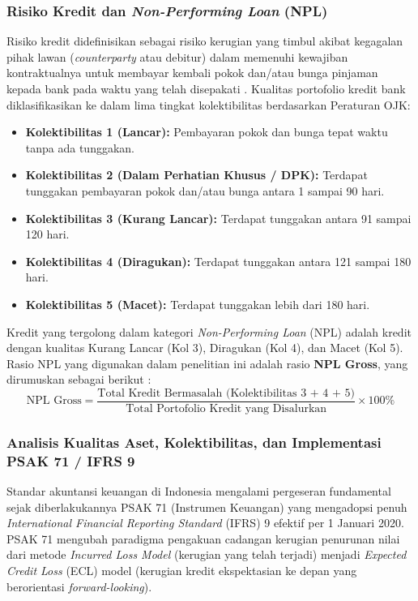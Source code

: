 \documentclass[12pt,a4paper]{article}
\numberwithin{equation}{section}
\begin{document}
\subsubsection{Risiko Kredit dan \emph{Non-Performing Loan} (NPL)}
\noindent
Risiko kredit didefinisikan sebagai risiko kerugian yang timbul akibat kegagalan pihak lawan (\emph{counterparty} atau debitur) dalam memenuhi kewajiban kontraktualnya untuk membayar kembali pokok dan/atau bunga pinjaman kepada bank pada waktu yang telah disepakati \citep{KuncoroSuhardjono2018}. Kualitas portofolio kredit bank diklasifikasikan ke dalam lima tingkat kolektibilitas berdasarkan Peraturan OJK:
\begin{itemize}
  \item \textbf{Kolektibilitas 1 (Lancar):} Pembayaran pokok dan bunga tepat waktu tanpa ada tunggakan.
  \item \textbf{Kolektibilitas 2 (Dalam Perhatian Khusus / DPK):} Terdapat tunggakan pembayaran pokok dan/atau bunga antara 1 sampai 90 hari.
  \item \textbf{Kolektibilitas 3 (Kurang Lancar):} Terdapat tunggakan antara 91 sampai 120 hari.
  \item \textbf{Kolektibilitas 4 (Diragukan):} Terdapat tunggakan antara 121 sampai 180 hari.
  \item \textbf{Kolektibilitas 5 (Macet):} Terdapat tunggakan lebih dari 180 hari.
\end{itemize}

\noindent
Kredit yang tergolong dalam kategori \emph{Non-Performing Loan} (NPL) adalah kredit dengan kualitas Kurang Lancar (Kol 3), Diragukan (Kol 4), dan Macet (Kol 5). Rasio NPL yang digunakan dalam penelitian ini adalah rasio \textbf{NPL Gross}, yang dirumuskan sebagai berikut \citep{Dendawijaya2015, OJK2021}:
\begin{equation}
  \text{NPL Gross} = \frac{\text{Total Kredit Bermasalah (Kolektibilitas 3 + 4 + 5)}}{\text{Total Portofolio Kredit yang Disalurkan}} \times 100\%
\end{equation}

\subsubsection{Analisis Kualitas Aset, Kolektibilitas, dan Implementasi PSAK 71 / IFRS 9}
\noindent
Standar akuntansi keuangan di Indonesia mengalami pergeseran fundamental sejak diberlakukannya PSAK 71 (Instrumen Keuangan) yang mengadopsi penuh \emph{International Financial Reporting Standard} (IFRS) 9 efektif per 1 Januari 2020. PSAK 71 mengubah paradigma pengakuan cadangan kerugian penurunan nilai dari metode \emph{Incurred Loss Model} (kerugian yang telah terjadi) menjadi \emph{Expected Credit Loss} (ECL) model (kerugian kredit ekspektasian ke depan yang berorientasi \emph{forward-looking}).
\end{document}
